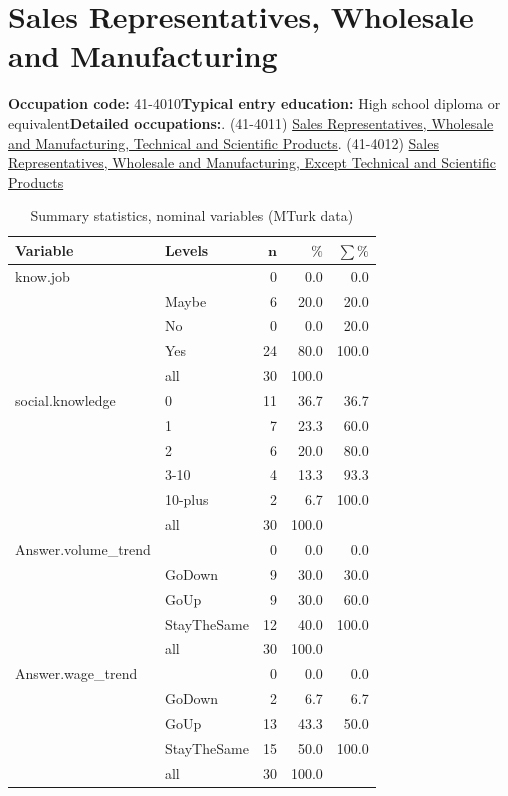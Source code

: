 \documentclass[a4paper,10pt]{article}\usepackage[]{graphicx}\usepackage[]{color}
\begin{document}
\newpage\section{Sales Representatives, Wholesale and Manufacturing}\textbf{Occupation code:} 41-4010\newline\textbf{Typical entry education:} High school diploma or equivalent\newline\textbf{Detailed occupations:}. (41-4011)  \href{http://www.bls.gov/oes/current/oes414011.htm}{Sales Representatives, Wholesale and Manufacturing, Technical and Scientific Products}. (41-4012)  \href{http://www.bls.gov/oes/current/oes414012.htm}{Sales Representatives, Wholesale and Manufacturing, Except Technical and Scientific Products}\newline%
\begin{table}[ht]
\centering
{\footnotesize
\begin{tabular}{ll|rrr}
 \textbf{Variable} & \textbf{Levels} & $\mathbf{n}$ & $\mathbf{\%}$ & $\mathbf{\sum \%}$ \\ 
  \hline
know.job &  & 0 & 0.0 & 0.0 \\ 
   & Maybe & 6 & 20.0 & 20.0 \\ 
   & No & 0 & 0.0 & 20.0 \\ 
   & Yes & 24 & 80.0 & 100.0 \\ 
   \hline
 & all & 30 & 100.0 &  \\ 
   \hline
\hline
social.knowledge & 0 & 11 & 36.7 & 36.7 \\ 
   & 1 & 7 & 23.3 & 60.0 \\ 
   & 2 & 6 & 20.0 & 80.0 \\ 
   & 3-10 & 4 & 13.3 & 93.3 \\ 
   & 10-plus & 2 & 6.7 & 100.0 \\ 
   \hline
 & all & 30 & 100.0 &  \\ 
   \hline
\hline
Answer.volume\_trend &  & 0 & 0.0 & 0.0 \\ 
   & GoDown & 9 & 30.0 & 30.0 \\ 
   & GoUp & 9 & 30.0 & 60.0 \\ 
   & StayTheSame & 12 & 40.0 & 100.0 \\ 
   \hline
 & all & 30 & 100.0 &  \\ 
   \hline
\hline
Answer.wage\_trend &  & 0 & 0.0 & 0.0 \\ 
   & GoDown & 2 & 6.7 & 6.7 \\ 
   & GoUp & 13 & 43.3 & 50.0 \\ 
   & StayTheSame & 15 & 50.0 & 100.0 \\ 
   \hline
 & all & 30 & 100.0 &  \\ 
   \hline
\hline
\end{tabular}
}
\caption{Summary statistics, nominal variables (MTurk data)} 
\label{tab1:41-4010}
\end{table}
\end{document}
